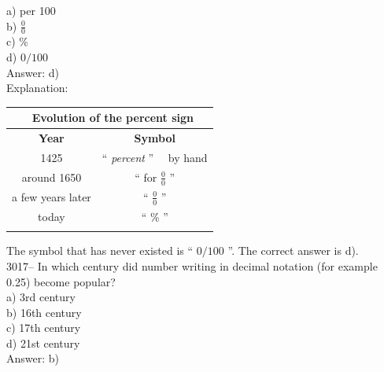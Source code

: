 \documentclass[letterpaper, 12pt]{article}
\begin{document}
a) per 100\\[2mm]
b) $\frac{0}{0}$\\[2mm]
c) \%\\[2mm]
d) $\scriptstyle0/100$\\[2mm]

Answer: d)\\

Explanation:\\
\begin{center}
\begin{tabular}{|c|c|}
\multicolumn{2}{c}{\bf \ Evolution of the percent sign}\\[2mm] \hline
{\bf Year} & {\bf Symbol} \\[1mm] \hline \hline
1425 & `` \emph{percent} '' \ \ by hand \\[1mm] \hline
around 1650 & `` for $\frac{0}{0}$ '' \\[1mm] \hline
a few years later & `` $\frac{0}{0}$ '' \\[1mm] \hline
today & `` \% '' \\[1mm] \hline
\multicolumn{2}{c}{}
\end{tabular}
\end{center}
The symbol that has never existed is `` $\scriptstyle0/100$ ''. The correct answer is d).\\



3017-- In which century did number writing in decimal notation (for example 0.25) become popular?\\

a) 3rd century\\
b) 16th century\\
c) 17th century\\
d) 21st century\\

Answer: b)\\
\end{document}
